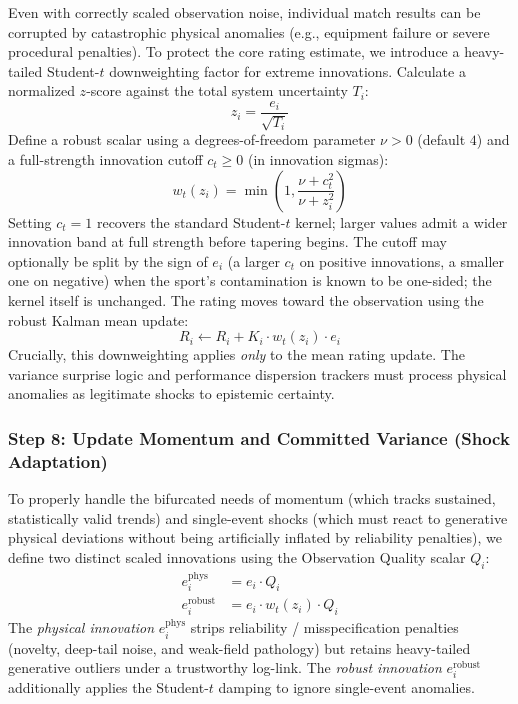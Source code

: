\documentclass[12pt]{article}
\newcommand{\nudof}{\nu}       %
\newcommand{\ctcut}{c_t}       %
\newcommand{\ephys}{e_i^{\mathrm{phys}}}
\newcommand{\erobust}{e_i^{\mathrm{robust}}}
\begin{document}
	Even with correctly scaled observation noise, individual match results can be corrupted by catastrophic physical anomalies (e.g., equipment failure or severe procedural penalties). To protect the core rating estimate, we introduce a heavy-tailed Student-$t$ downweighting factor for extreme innovations. Calculate a normalized $z$-score against the total system uncertainty $T_i$:
	\begin{equation}
		z_i = \frac{e_i}{\sqrt{T_i}}
	\end{equation}
	Define a robust scalar using a degrees-of-freedom parameter \(\nudof > 0\) (default \(4\)) and a full-strength innovation cutoff \(\ctcut \ge 0\) (in innovation sigmas):
	\begin{equation}
		w_t(z_i) = \min\!\left(1,\frac{\nudof + \ctcut^2}{\nudof + z_i^2}\right)
	\end{equation}
	Setting \(\ctcut = 1\) recovers the standard Student-$t$ kernel; larger values admit a wider innovation band at full strength before tapering begins. The cutoff may optionally be split by the sign of \(e_i\) (a larger \(\ctcut\) on positive innovations, a smaller one on negative) when the sport's contamination is known to be one-sided; the kernel itself is unchanged.
	The rating moves toward the observation using the robust Kalman mean update:
	\begin{equation}
		R_i \leftarrow R_i + K_i \cdot w_t(z_i) \cdot e_i
	\end{equation}
	Crucially, this downweighting applies \emph{only} to the mean rating update. The variance surprise logic and performance dispersion trackers must process physical anomalies as legitimate shocks to epistemic certainty.

	\subsubsection*{Step 8: Update Momentum and Committed Variance (Shock Adaptation)}
	To properly handle the bifurcated needs of momentum (which tracks sustained, statistically valid trends) and single-event shocks (which must react to generative physical deviations without being artificially inflated by reliability penalties), we define two distinct scaled innovations using the Observation Quality scalar $Q_i$:
	\begin{align}
		\ephys &= e_i \cdot Q_i \\
		\erobust &= e_i \cdot w_t(z_i) \cdot Q_i
	\end{align}
	The \textit{physical innovation} $\ephys$ strips reliability / misspecification penalties (novelty, deep-tail noise, and weak-field pathology) but retains heavy-tailed generative outliers under a trustworthy log-link. The \textit{robust innovation} $\erobust$ additionally applies the Student-$t$ damping to ignore single-event anomalies.
\end{document}
